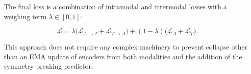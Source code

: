 \documentclass{article}
\begin{document}
The final loss is a combination of intramodal and intermodal losses with a weighing term $\lambda \in [0, 1]$:

\begin{equation}
    \mathcal{L} = \lambda \big(\mathcal{L}_{A \to T} + \mathcal{L}_{T \to A}\big) + (1-\lambda) \big(\mathcal{L}_{A} + \mathcal{L}_{T} \big).
\end{equation}


This approach does not require any complex machinery to prevent collapse other than an EMA update of encoders from both modalities and the addition of the symmetry-breaking predictor.






\end{document}
